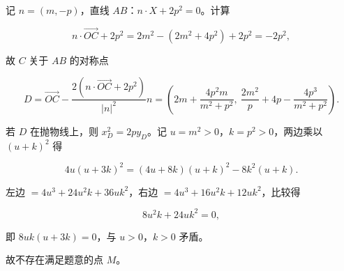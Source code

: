 \begin{answer}
记 $n=(m,-p)$，直线 $AB$：$n\cdot X+2p^2=0$。计算

\nopagebreak[4]
\[n\cdot\overrightarrow{OC}+2p^2=2m^2-\left(2m^2+4p^2\right)+2p^2=-2p^2,\]

故 $C$ 关于 $AB$ 的对称点

\nopagebreak[4]
\[D=\overrightarrow{OC}-\frac{2\left(n\cdot\overrightarrow{OC}+2p^2\right)}{|n|^2}n=\left(2m+\frac{4p^2m}{m^2+p^2},\ \frac{2m^2}p+4p-\frac{4p^3}{m^2+p^2}\right).\]

若 $D$ 在抛物线上，则 $x_D^2=2py_D$。记 $u=m^2>0$，$k=p^2>0$，两边乘以 $(u+k)^2$ 得

\nopagebreak[4]
\[4u(u+3k)^2=(4u+8k)(u+k)^2-8k^2(u+k).\]

左边 $=4u^3+24u^2k+36uk^2$，右边 $=4u^3+16u^2k+12uk^2$，比较得

\nopagebreak[4]
\[8u^2k+24uk^2=0,\]

即 $8uk(u+3k)=0$，与 $u>0$，$k>0$ 矛盾。

故不存在满足题意的点 $M$。


\end{answer}